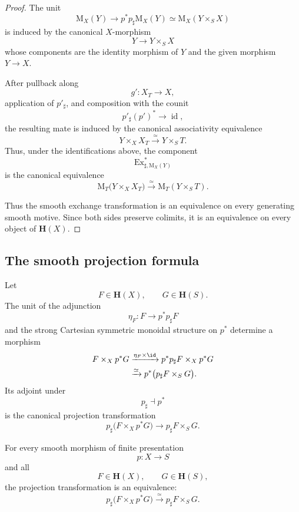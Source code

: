 \begin{proof}
The unit
\[
    \mathrm M_X(Y)
    \longrightarrow
    p^*p_\sharp\mathrm M_X(Y)
    \simeq
    \mathrm M_X(Y\times_SX)
\]
is induced by the canonical \(X\)-morphism
\[
    Y
    \longrightarrow
    Y\times_SX
\]
whose components are the identity morphism of \(Y\) and the given
morphism \(Y\to X\).

After pullback along
\[
    g'
    \colon
    X_T
    \longrightarrow
    X,
\]
application of \(p'_\sharp\), and composition with the counit
\[
    p'_\sharp(p')^*
    \longrightarrow
    \operatorname{id},
\]
the resulting mate is induced by the canonical associativity
equivalence
\[
    Y\times_XX_T
    \xrightarrow{\simeq}
    Y\times_ST.
\]
Thus, under the identifications above, the component
\[
    \operatorname{Ex}_{\sharp,\mathrm M_X(Y)}^{*}
\]
is the canonical equivalence
\[
    \mathrm M_T
    \bigl(
        Y\times_XX_T
    \bigr)
    \xrightarrow{\simeq}
    \mathrm M_T(Y\times_ST).
\]

Thus the smooth exchange transformation is an equivalence on every
generating smooth motive. Since both sides preserve colimits, it is an
equivalence on every object of \(\mathbf H(X)\).
\end{proof}

\subsection{The smooth projection formula}

\begin{construction}
\label{con:unstable-smooth-projection-transformation}
Let
\[
    F\in\mathbf H(X),
    \qquad
    G\in\mathbf H(S).
\]
The unit of the adjunction
\[
    \eta_F
    \colon
    F
    \longrightarrow
    p^*p_\sharp F
\]
and the strong Cartesian symmetric monoidal structure on \(p^*\)
determine a morphism
\[
\begin{aligned}
    F\times_Xp^*G
    &\xrightarrow{\eta_F\times\id}
    p^*p_\sharp F\times_Xp^*G
    \\
    &\xrightarrow{\simeq}
    p^*
    \bigl(
        p_\sharp F\times_SG
    \bigr).
\end{aligned}
\]
Its adjoint under
\[
    p_\sharp
    \dashv
    p^*
\]
is the canonical projection transformation
\[
    p_\sharp
    \bigl(
        F\times_Xp^*G
    \bigr)
    \longrightarrow
    p_\sharp F\times_SG.
\]
\end{construction}

\begin{theorem}
\label{thm:unstable-smooth-projection-formula}
For every smooth morphism of finite presentation
\[
    p
    \colon
    X
    \longrightarrow
    S
\]
and all
\[
    F\in\mathbf H(X),
    \qquad
    G\in\mathbf H(S),
\]
the projection transformation is an equivalence:
\[
    p_\sharp
    \bigl(
        F\times_Xp^*G
    \bigr)
    \xrightarrow{\simeq}
    p_\sharp F\times_SG.
\]
\end{theorem}

